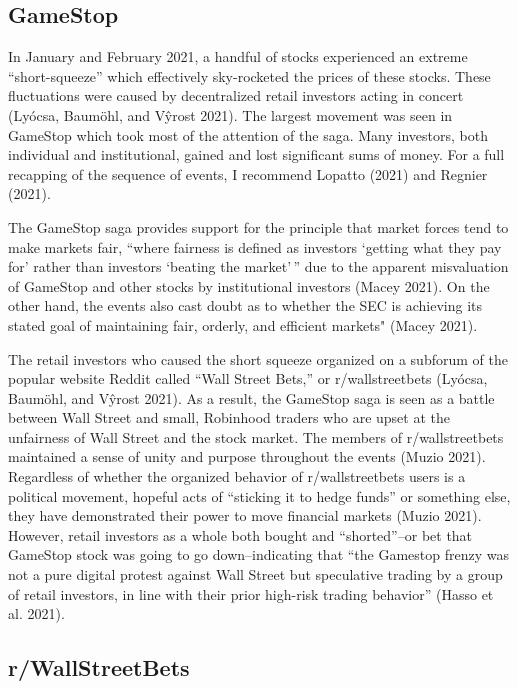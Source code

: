 \documentclass[12pt,]{article}
\begin{document}
\hypertarget{gamestop}{%
\subsection{GameStop}\label{gamestop}}

In January and February 2021, a handful of stocks experienced an extreme
``short-squeeze'' which effectively sky-rocketed the prices of these
stocks. These fluctuations were caused by decentralized retail investors
acting in concert (Lyócsa, Baumöhl, and Vŷrost 2021). The largest
movement was seen in GameStop which took most of the attention of the
saga. Many investors, both individual and institutional, gained and lost
significant sums of money. For a full recapping of the sequence of
events, I recommend Lopatto (2021) and Regnier (2021).

The GameStop saga provides support for the principle that market forces
tend to make markets fair, ``where fairness is defined as investors
`getting what they pay for' rather than investors `beating the
market'\,'' due to the apparent misvaluation of GameStop and other
stocks by institutional investors (Macey 2021). On the other hand, the
events also cast doubt as to whether the SEC is achieving its stated
goal of maintaining fair, orderly, and efficient markets" (Macey 2021).

The retail investors who caused the short squeeze organized on a
subforum of the popular website Reddit called ``Wall Street Bets,'' or
r/wallstreetbets (Lyócsa, Baumöhl, and Vŷrost 2021). As a result, the
GameStop saga is seen as a battle between Wall Street and small,
Robinhood traders who are upset at the unfairness of Wall Street and the
stock market. The members of r/wallstreetbets maintained a sense of
unity and purpose throughout the events (Muzio 2021). Regardless of
whether the organized behavior of r/wallstreetbets users is a political
movement, hopeful acts of ``sticking it to hedge funds'' or something
else, they have demonstrated their power to move financial markets
(Muzio 2021). However, retail investors as a whole both bought and
``shorted''--or bet that GameStop stock was going to go down--indicating
that ``the Gamestop frenzy was not a pure digital protest against Wall
Street but speculative trading by a group of retail investors, in line
with their prior high-risk trading behavior'' (Hasso et al. 2021).

\hypertarget{rwallstreetbets}{%
\subsection{r/WallStreetBets}\label{rwallstreetbets}}
\end{document}
